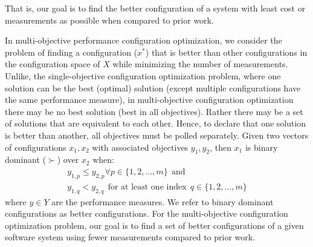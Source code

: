 \documentclass[10pt,journal,compsoc]{IEEEtran}
\newcommand{\flash}{{\sc Flash}\xspace}
\begin{document}
\noindent That is, our goal is to find the better configuration of a system with least cost or measurements as possible when compared to prior work.
 
 
In multi-objective performance configuration optimization,
we consider the problem of finding a  configuration ($x^*$) that is better than other configurations in the configuration space of $X$ while minimizing the number of measurements. Unlike, the single-objective configuration optimization problem, where one solution can be the best (optimal) solution (except multiple configurations have the same performance measure), in multi-objective configuration optimization there may be no best solution (best in all objectives). Rather there may be a set of solutions that are equivalent to each other. Hence,
to declare that one solution is better than another, all objectives must be polled separately. Given two vectors of configurations $x_1,x_2$ with associated objectives $y_{1}, y_{2}$,
then $x_1$ is binary dominant ($\succ$) over $x_2$ when:
\begin{equation}\label{eq:bdom}
    \begin{gathered}
            y_{1,p} \le y_{2,p} \forall p \in \{1, 2,..., m\}~~\text{and}\\
            y_{1,q} < y_{2, q}~~\text{for at least one index}~~q \in \{1, 2,...,m\}
    \end{gathered}
\end{equation}
where \textit{$y\in Y$} are the performance measures. We refer to binary dominant configurations as better configurations. For the multi-objective configuration optimization problem, our goal is to find a set of  better configurations of a given software system using fewer measurements compared to prior work.

\end{document}
